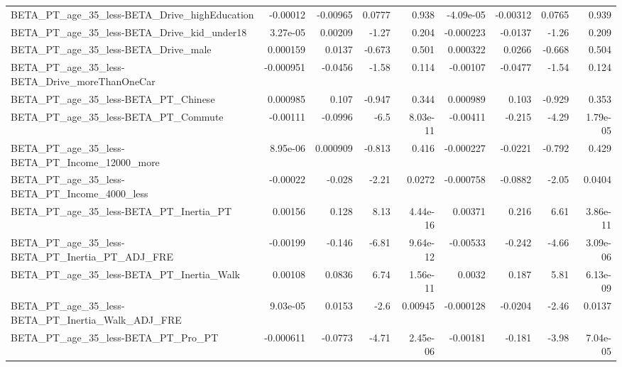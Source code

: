 \begin{tabular}{lrrrrrrrr}
BETA\_PT\_age\_35\_less-BETA\_Drive\_highEducation       &    -0.00012 &     -0.00965 &   0.0777 &    0.938 &  -4.09e-05 &    -0.00312 &       0.0765 &         0.939 \\
BETA\_PT\_age\_35\_less-BETA\_Drive\_kid\_under18         &    3.27e-05 &      0.00209 &    -1.27 &    0.204 &  -0.000223 &     -0.0137 &        -1.26 &         0.209 \\
BETA\_PT\_age\_35\_less-BETA\_Drive\_male                &    0.000159 &       0.0137 &   -0.673 &    0.501 &   0.000322 &      0.0266 &       -0.668 &         0.504 \\
BETA\_PT\_age\_35\_less-BETA\_Drive\_moreThanOneCar      &   -0.000951 &      -0.0456 &    -1.58 &    0.114 &   -0.00107 &     -0.0477 &        -1.54 &         0.124 \\
BETA\_PT\_age\_35\_less-BETA\_PT\_Chinese                &    0.000985 &        0.107 &   -0.947 &    0.344 &   0.000989 &       0.103 &       -0.929 &         0.353 \\
BETA\_PT\_age\_35\_less-BETA\_PT\_Commute                &    -0.00111 &      -0.0996 &     -6.5 & 8.03e-11 &   -0.00411 &      -0.215 &        -4.29 &      1.79e-05 \\
BETA\_PT\_age\_35\_less-BETA\_PT\_Income\_12000\_more      &    8.95e-06 &     0.000909 &   -0.813 &    0.416 &  -0.000227 &     -0.0221 &       -0.792 &         0.429 \\
BETA\_PT\_age\_35\_less-BETA\_PT\_Income\_4000\_less       &    -0.00022 &       -0.028 &    -2.21 &   0.0272 &  -0.000758 &     -0.0882 &        -2.05 &        0.0404 \\
BETA\_PT\_age\_35\_less-BETA\_PT\_Inertia\_PT             &     0.00156 &        0.128 &     8.13 & 4.44e-16 &    0.00371 &       0.216 &         6.61 &      3.86e-11 \\
BETA\_PT\_age\_35\_less-BETA\_PT\_Inertia\_PT\_ADJ\_FRE     &    -0.00199 &       -0.146 &    -6.81 & 9.64e-12 &   -0.00533 &      -0.242 &        -4.66 &      3.09e-06 \\
BETA\_PT\_age\_35\_less-BETA\_PT\_Inertia\_Walk           &     0.00108 &       0.0836 &     6.74 & 1.56e-11 &     0.0032 &       0.187 &         5.81 &      6.13e-09 \\
BETA\_PT\_age\_35\_less-BETA\_PT\_Inertia\_Walk\_ADJ\_FRE   &    9.03e-05 &       0.0153 &     -2.6 &  0.00945 &  -0.000128 &     -0.0204 &        -2.46 &        0.0137 \\
BETA\_PT\_age\_35\_less-BETA\_PT\_Pro\_PT                 &   -0.000611 &      -0.0773 &    -4.71 & 2.45e-06 &   -0.00181 &      -0.181 &        -3.98 &      7.04e-05 \\

\end{tabular}
